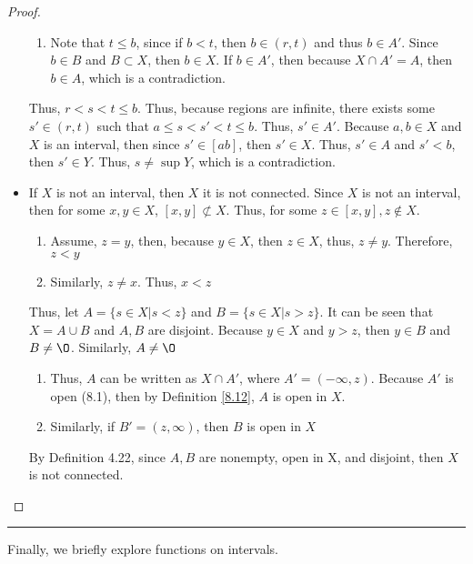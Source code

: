 \documentclass[openany, amssymb, psamsfonts]{amsart}
\renewcommand{\emptyset}{\O}
\theoremstyle{definition}
\numberwithin{equation}{section}
\begin{document}
\begin{proof}
\begin{itemize}
\begin{enumerate}
            \item Note that $t\leq b$, since if $b<t$, then $b\in (r,t)$ and thus $b\in A'$. Since $b\in B$ and $B\subset X$, then $b\in X$. If $b\in A'$, then because $X\cap A' = A$, then $b\in A$, which is a contradiction.
        \end{enumerate}
        Thus, $r<s<t\leq b$. Thus, because regions are infinite, there exists some $s'\in (r,t)$ such that $a\leq s<s'<t\leq b$. Thus, $s'\in A'$. Because $a,b \in X$ and $X$ is an interval, then since $s'\in [ab]$, then $s'\in X$. Thus, $s'\in A$ and $s'<b$, then $s'\in Y$. Thus, $s\neq \sup Y$, which is a contradiction. 
        \item If $X$ is not an interval, then $X$ it is not connected. Since $X$ is not an interval, then for some $x,y \in X$, $[x,y]\not\subset X$. Thus, for some $z\in [x,y], z\notin X$. 
        \begin{enumerate}
            \item Assume, $z=y$, then, because $y\in X$, then $z\in X$, thus, $z\neq y$. Therefore, $z<y$
            \item Similarly, $z\neq x$. Thus, $x<z$
        \end{enumerate}
        Thus, let $A = \{s\in X | s <z\}$ and $B = \{s \in X | s>z\}$. It can be seen that $X = A \cup B$ and $A,B$ are disjoint. Because $y\in X$ and $y>z$, then $y\in B$ and $B \neq \emptyset$. Similarly, $A\neq \emptyset$
        \begin{enumerate}
            \item Thus, $A$ can be written as $X \cap A'$, where $A' = (-\infty, z)$. Because $A'$ is open (8.1), then by Definition \ref{8.12}, $A$ is open in $X$.
            \item Similarly, if $B' = (z,\infty)$, then $B$ is open in $X$
        \end{enumerate}
        By Definition 4.22, since $A,B$ are nonempty, open in X, and disjoint, then $X$ is not connected.
    \end{itemize}
\end{proof}\vspace{4pt}     \hrule   \vspace{4pt} 

Finally, we briefly explore functions on intervals. 
\end{document}
